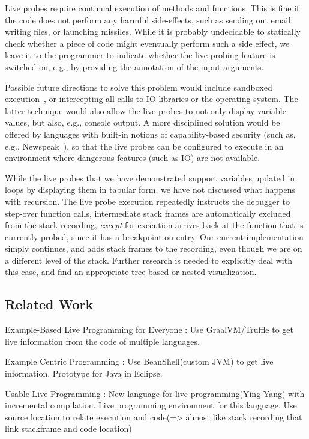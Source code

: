 \documentclass[english,submission]{programming}
\begin{document}
Live probes require continual execution of methods and functions. This is fine if the code does not perform any harmful side-effects, such as sending out email, writing files, or launching missiles. While it is probably undecidable to statically check whether a piece of code might eventually perform such a side effect, we leave it to the programmer to indicate whether the live probing feature is switched on, e.g., by providing the annotation of the input arguments. 

Possible future directions to solve this problem would include sandboxed execution~\cite{???}, or intercepting all calls to IO libraries or the operating system. The latter technique would also allow the live probes to not only display variable values, but also, e.g., console output. 
A more disciplined solution would be offered by languages with built-in notions of capability-based security (such as, e.g., Newspeak~\cite{Newspeak}), so that the live probes can be configured to execute in an environment where dangerous features (such as IO) are not available.  

While the live probes that we have demonstrated support variables updated in loops by displaying them in tabular form, we have not discussed what happens with recursion. The live probe execution repeatedly instructs the debugger to step-over function calls, intermediate stack frames are automatically excluded from the stack-recording, \textit{except} for execution arrives back at the function that is currently probed, since it has a breakpoint on entry. Our current implementation simply continues, and adds stack frames to the recording, even though we are on a different level of the stack. Further research is needed to explicitly deal with this case, and find an appropriate tree-based or nested visualization.

\subsection{Related Work}

Example-Based Live Programming for Everyone\cite{ExampleBasedGraalVM} : Use GraalVM/Truffle to get live information from the code of multiple languages.

Example Centric Programming\cite{ExampleCentric} : Use BeanShell(custom JVM) to get live information. Prototype for Java in Eclipse.

Usable Live Programming\cite{UsableLiveProgramming} : New language for live programming(Ying Yang) with incremental compilation. Live programming environment for this language.
Use source location to relate execution and code(=> almost like stack recording that link stackframe and code location)
\end{document}
